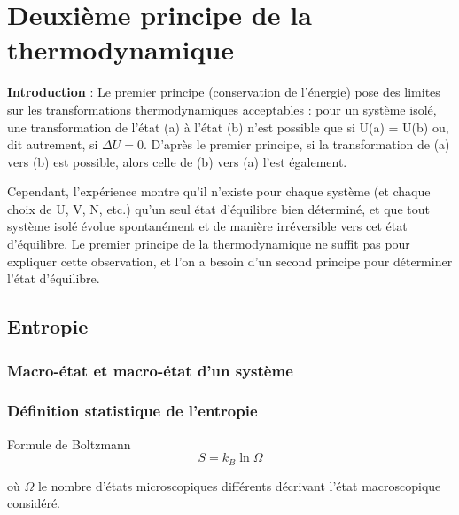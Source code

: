 \chapter{Deuxième principe de la thermodynamique} %
\label{chap:Deuxième principe. Bilans d'entropie}

\textbf{Introduction} : Le premier principe (conservation de l’énergie) pose des limites sur les transformations thermodynamiques acceptables : pour un système isolé, une transformation de l’état (a) à l’état (b) n’est possible que si U(a) = U(b) ou, dit autrement, si $\Delta U = 0$. D’après le premier principe, si la transformation de (a) vers (b) est possible, alors celle de (b) vers (a) l’est également.

Cependant, l’expérience montre qu’il n’existe pour chaque système (et chaque choix de U, V, N, etc.) qu’un seul état d’équilibre bien déterminé, et que tout système isolé évolue spontanément et de manière irréversible vers cet état d’équilibre. Le premier principe de la thermodynamique ne suffit pas pour expliquer cette observation, et l’on a besoin d’un second principe pour déterminer l’état d’équilibre. 


\section{Entropie} %
\subsection{Macro-état et macro-état d'un système} %
\label{sub:Macro-état et macro-état d'un système}

\subsection{Définition statistique de l'entropie} %
\label{sub:Définition statistique de l'entropie}

\begin{Theorem}{Formule de Boltzmann}{}
\begin{equation}
  S = k_B \ln \Omega
\end{equation}

où $\Omega$ le nombre d'états microscopiques différents décrivant l'état macroscopique considéré.
\end{Theorem}





